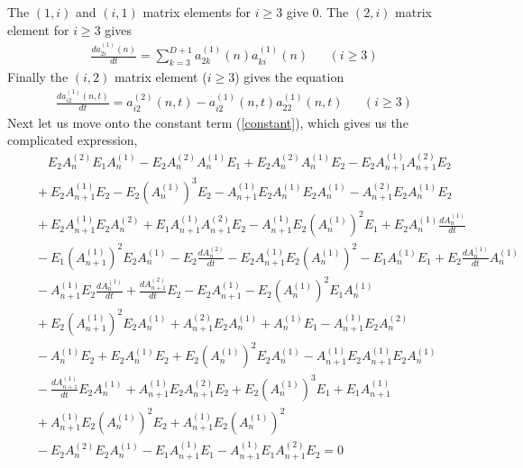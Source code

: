 \documentclass[12pt]{article}
\theoremstyle{definition}
\begin{document}
The $(1,i)$ and $(i,1)$ matrix elements for $i\geq 3$ give $0$.  The $(2,i)$ matrix element for $i \geq 3$ gives
\begin{align*}
\frac{d a_{2i}^{(1)}(n)}{dt} = \sum_{k=3}^{D+1} a_{2k}^{(1)}(n) a_{ki}^{(1)}(n) & & (i \geq 3)
\end{align*}
Finally the $(i,2)$ matrix element ($i\geq 3$) gives the equation
\begin{align*}
\frac{d a_{i2}^{(1)}(n,t)}{dt} = a_{i2}^{(2)}(n,t) - a_{i2}^{(1)}(n,t) a_{22}^{(1)}(n,t) & & (i \geq 3)
\end{align*}
Next let us move onto the constant term (\ref{constant}), which gives us the complicated expression,
\begin{equation}\label{constant2}
\begin{split} 
&\quad\quad  E_2 A^{(2)}_n E_1 A^{(1)}_n - E_2 A^{(2)}_n A^{(1)}_n E_1 + E_2 A^{(2)}_n A^{(1)}_n  E_2 - E_2 A^{(1)}_{n+1} A^{(2)}_{n+1} E_2  \\
&\quad + E_2 A^{(1)}_{n+1} E_2 - E_2 (A^{(1)}_n)^3 E_2 
- A^{(1)}_{n+1} E_2 A^{(1)}_n  E_2 A^{(1)}_n - A^{(2)}_{n+1} E_2 A^{(1)}_n  E_2 
 \\
 &\quad + E_2 A^{(1)}_{n+1} E_2 A^{(2)}_n + E_1 A^{(1)}_{n+1} A^{(2)}_{n+1} E_2 - A^{(1)}_{n+1} E_2 (A^{(1)}_n)^2 E_1 + E_2 A^{(1)}_n \frac{d A^{(1)}_n }{dt} \\
&\quad  - E_1 (A^{(1)}_{n+1})^2 E_2 A^{(1)}_n - E_2 \frac{ d A^{(2)}_n}{dt}
- E_2 A^{(1)}_{n+1} E_2 (A^{(1)}_n )^2 - E_1 A^{(1)}_n E_1 + E_2 \frac{ d A^{(1)}_n}{dt} A^{(1)}_n \\
&\quad - A^{(1)}_{n+1} E_2 \frac{ d A^{(1)}_n}{dt} + \frac{ d A^{(2)}_{n+1}}{dt} E_2 - E_2 A^{(1)}_{n+1}
- E_2 (A^{(1)}_n )^2 E_1 A^{(1)}_n \\
&\quad + E_2 (A^{(1)}_{n+1})^2 E_2 A^{(1)}_n + A^{(2)}_{n+1} E_2 A^{(1)}_n 
+ A^{(1)}_n E_1 - A^{(1)}_{n+1} E_2 A^{(2)}_n  \\
&\quad - A^{(1)}_n  E_2 + E_2 A^{(1)}_n  E_2
+ E_2 (A^{(1)}_n)^2 E_2 A^{(1)}_n - A^{(1)}_{n+1}  E_2 A^{(1)}_{n+1} E_2 A^{(1)}_n \\
&\quad - \frac{d A^{(1)}_{n+1}}{dt} E_2 A^{(1)}_n + A^{(1)}_{n+1} E_2 A^{(2)}_{n+1} E_2
+ E_2 (A^{(1)}_n)^3 E_1 + E_1 A^{(1)}_{n+1} \\
&\quad + A^{(1)}_{n+1} E_2 (A^{(1)}_n)^2 E_2
+ A^{(1)}_{n+1} E_2 (A^{(1)}_n)^2 \\
&\quad -E_2 A^{(2)}_n E_2 A^{(1)}_n - E_1 A^{(1)}_{n+1} E_1 - A^{(1)}_{n+1} E_1 A^{(2)}_{n+1} E_2 = 0
\end{split}
\end{equation}
\end{document}
